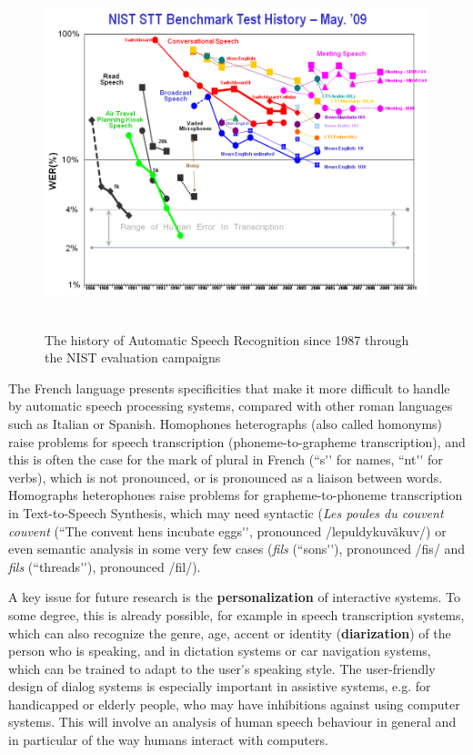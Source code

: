 \begin{multicols}{2}
\begin{figure}[!ht]
\begin{center}
  \includegraphics[height=4.0in]{_media/french/french_pix8_speech_reco_nist.png}
  \caption{The history of Automatic Speech Recognition since 1987 through the NIST evaluation campaigns~\cite{speechreconist}}
  \label{fig:nistreco}
\end{center}
\end{figure}

The French language presents specificities that make it more difficult
to handle by automatic speech processing systems, compared with other
roman languages such as Italian or Spanish. Homophones heterographs
(also called homonyms) raise problems for speech transcription
(phoneme-to-grapheme transcription), and this is often the case for
the mark of plural in French (``s{\mbox '}{\mbox '} for names, ``nt{\mbox '}{\mbox '} for verbs), which is
not pronounced, or is pronounced as a liaison between
words. Homographs heterophones raise problems for grapheme-to-phoneme
transcription in Text-to-Speech Synthesis, which may need syntactic
({\em Les poules du couvent couvent} (``The convent hens incubate eggs{\mbox '}{\mbox '},
pronounced /lepuldykuvãkuv/) or even semantic analysis in some very
few cases ({\em fils} (``sons{\mbox '}{\mbox '}), pronounced /fis/ and {\em fils} (``threads{\mbox '}{\mbox '}),
pronounced /fil/).

A key issue for future research is the {\bf personalization} of interactive
systems. To some degree, this is already possible, for example in
speech transcription systems, which can also recognize the genre, age,
accent or identity ({\bf diarization}) of the person who is speaking, and in
dictation systems or car navigation systems, which can be trained to
adapt to the user{\mbox '}s speaking style. The user-friendly design of dialog
systems is especially important in assistive systems, e.g. for
handicapped or elderly people, who may have inhibitions against using
computer systems. This will involve an analysis of human speech
behaviour in general and in particular of the way humans interact with
computers.


\end{multicols}
